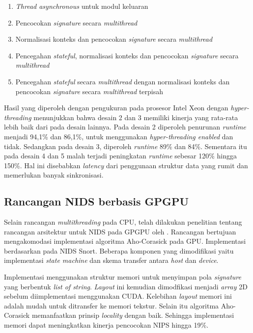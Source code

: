     \begin{enumerate}
      \item \emph{Thread asynchronous} untuk modul keluaran
      \item Pencocokan \emph{signature} secara \emph{multithread}
      \item Normalisasi konteks dan pencocokan \emph{signature} secara \emph{multithread}
      \item Pencegahan \emph{stateful}, normalisasi konteks dan pencocokan \emph{signature} secara \emph{multithread}
      \item Pencegahan \emph{stateful} secara \emph{multithread} dengan normalisasi konteks dan pencocokan \emph{signature} secara \emph{multithread} terpisah
    \end{enumerate}

    Hasil yang diperoleh dengan pengukuran pada prosesor Intel Xeon dengan \emph{hyper-threading} menunjukkan bahwa desain 2 dan 3 memiliki kinerja yang rata-rata lebih baik dari pada desain lainnya. Pada desain 2 diperoleh penurunan \emph{runtime} menjadi 94,1\% dan 86,1\%, untuk menggunakan \emph{hyper-threading enabled} dan tidak. Sedangkan pada desain 3, diperoleh \emph{runtime} 89\% dan 84\%. Sementara itu pada desain 4 dan 5 malah terjadi peningkatan \emph{runtime} sebesar 120\% hingga 150\%. Hal ini disebabkan \emph{latency} dari penggunaan struktur data yang rumit dan memerlukan banyak sinkronisasi.

  \subsection{Rancangan NIDS berbasis GPGPU}

    Selain rancangan \emph{multithreading} pada CPU, telah dilakukan penelitian tentang rancangan arsitektur untuk NIDS pada GPGPU oleh \cite{gnort2008}. Rancangan bertujuan mengakomodasi implementasi algoritma Aho-Corasick pada GPU. Implementasi berdasarkan pada NIDS Snort. Beberapa komponen yang dimodifikasi yaitu implementasi \emph{state machine} dan skema transfer antara \emph{host} dan \emph{device}. 

    Implementasi menggunakan struktur memori untuk menyimpan pola \emph{signature} yang berbentuk \emph{list of string}. \emph{Layout} ini kemudian dimodfikasi menjadi \emph{array} 2D sebelum diimplementasi menggunakan CUDA. Kelebihan \emph{layout} memori ini adalah mudah untuk ditransfer ke memori tekstur. Selain itu algoritma Aho-Corasick memanfaatkan prinsip \emph{locality} dengan baik. Sehingga implementasi memori dapat meningkatkan kinerja pencocokan NIPS hingga 19\%.

